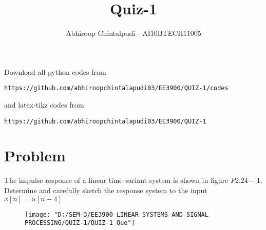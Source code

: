 \documentclass[journal,12pt,twocolumn]{IEEEtran}
\begin{document}
     \def\rightbox#1{\makebox[0in][r]{#1}}
     \def\centbox#1{\makebox[0in]{#1}}
     \def\topbox#1{\raisebox{-\baselineskip}[0in][0in]{#1}}
     \def\midbox#1{\raisebox{-0.5\baselineskip}[0in][0in]{#1}}
\vspace{3cm}
\title{Quiz-1}
\author{Abhiroop Chintalpudi - AI10BTECH11005}
\maketitle
\newpage
\bigskip
\renewcommand{\thefigure}{\theenumi}
\renewcommand{\thetable}{\theenumi}
Download all python codes from 
\begin{lstlisting}
https://github.com/abhiroopchintalapudi03/EE3900/QUIZ-1/codes
\end{lstlisting}
%
and latex-tikz codes from 
%
\begin{lstlisting}
https://github.com/abhiroopchintalapudi03/EE3900/QUIZ-1
\end{lstlisting}
\section{Problem}
The impulse response of a linear time-variant system is shown in figure $P2.24-1$. Determine and carefully sketch the response system to the input $x[n] = u[n-4]$
\begin{figure}[h]
	\centering
	\texttt{[image: "D:/SEM-3/EE3900 LINEAR SYSTEMS AND SIGNAL PROCESSING/QUIZ-1/QUIZ-1 Que"]}
	\caption{}
	\label{fig:quiz-1-que}
\end{figure}
\end{document}
